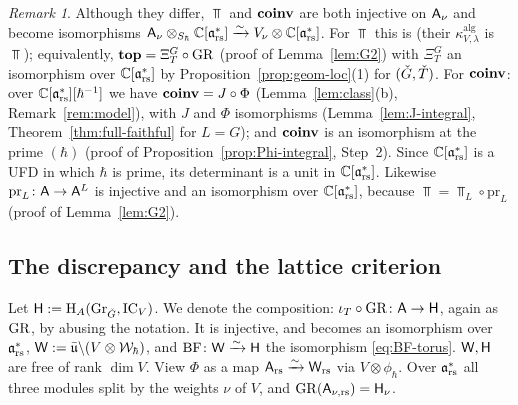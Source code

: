 \documentclass{article}
\theoremstyle{plain}
\theoremstyle{definition}
\theoremstyle{remark}
\newtheorem{remark}[theorem]{Remark}
\numberwithin{equation}{section}
\begin{document}
\begin{remark}\label{rem:top-generic}
Although they differ, $\Top$ and $\operatorname{\mathbf{coinv}}$ are both injective on $\mathsf A_\nu$ and become isomorphisms $\mathsf A_\nu\otimes_{S_\hbar}\mathbb{C}[\mathfrak{a}^*_{\mathrm{rs}}]\xrightarrow{\sim}V_\nu\otimes\mathbb{C}[\mathfrak{a}^*_{\mathrm{rs}}]$. For $\Top$ this is \cite[\S7.4, (7.4.2)]{ginzburg2014differentialoperatorsguaffine} (their $\kappa^{\mathrm{alg}}_{V,\lambda}$ is $\Top$); equivalently, $\operatorname{\mathbf{top}}=\Xi^G_T\circ\mathrm{GR}$ (proof of Lemma~\ref{lem:G2}) with $\Xi^G_T$ an isomorphism over $\mathbb{C}[\mathfrak{a}^*_{\mathrm{rs}}]$ by Proposition~\ref{prop:geom-loc}(1) for $({\check{G}},{\check{T}})$. For $\operatorname{\mathbf{coinv}}$: over $\mathbb{C}[\mathfrak{a}^*_{\mathrm{rs}}][\hbar^{-1}]$ we have $\operatorname{\mathbf{coinv}}=J\circ\Phi$ (Lemma~\ref{lem:class}(b), Remark~\ref{rem:model}), with $J$ and $\Phi$ isomorphisms (Lemma~\ref{lem:J-integral}, Theorem~\ref{thm:full-faithful} for $L=G$); and $\operatorname{\mathbf{coinv}}$ is an isomorphism at the prime $(\hbar)$ (proof of Proposition~\ref{prop:Phi-integral}, Step~2). Since $\mathbb{C}[\mathfrak{a}^*_{\mathrm{rs}}]$ is a UFD in which $\hbar$ is prime, its determinant is a unit in $\mathbb{C}[\mathfrak{a}^*_{\mathrm{rs}}]$. Likewise $\mathrm{pr}_L\colon\mathsf A\to\mathsf A^L$ is injective and an isomorphism over $\mathbb{C}[\mathfrak{a}^*_{\mathrm{rs}}]$, because $\Top=\Top_L\circ\mathrm{pr}_L$ (proof of Lemma~\ref{lem:G2}).
\end{remark}

\subsection{The discrepancy and the lattice criterion}\label{sec:disc-lattice}
Let $\mathsf H:=\mathrm{H}_A(\operatorname{Gr}_{{\check{G}}},\operatorname{IC}_V)$. We denote the composition: $\iota_T\circ\mathrm{GR}\colon\mathsf A\to\mathsf H$, again as $\mathrm{GR}$, by abusing the notation. It is injective, and becomes an isomorphism over $\mathfrak{a}^*_{\mathrm{rs}}$, $\mathsf W:=\bar{\mathfrak u}\backslash(V\otimes\mathcal{W}_\hbar)$, and $\mathrm{BF}\colon\mathsf W\xrightarrow{\sim}\mathsf H$ the isomorphism \eqref{eq:BF-torus}. $\mathsf W,\mathsf H$ are free of rank $\dim V$. View $\Phi$ as a map $\mathsf A_{\mathrm{rs}}\xrightarrow{\sim}\mathsf W_{\mathrm{rs}}$ via $V\otimes\phi_\hbar$. Over $\mathfrak{a}^*_{\mathrm{rs}}$ all three modules split by the weights $\nu$ of $V$, and $\mathrm{GR}(\mathsf A_{\nu,\mathrm{rs}})=\mathsf H_\nu$.
\end{document}
